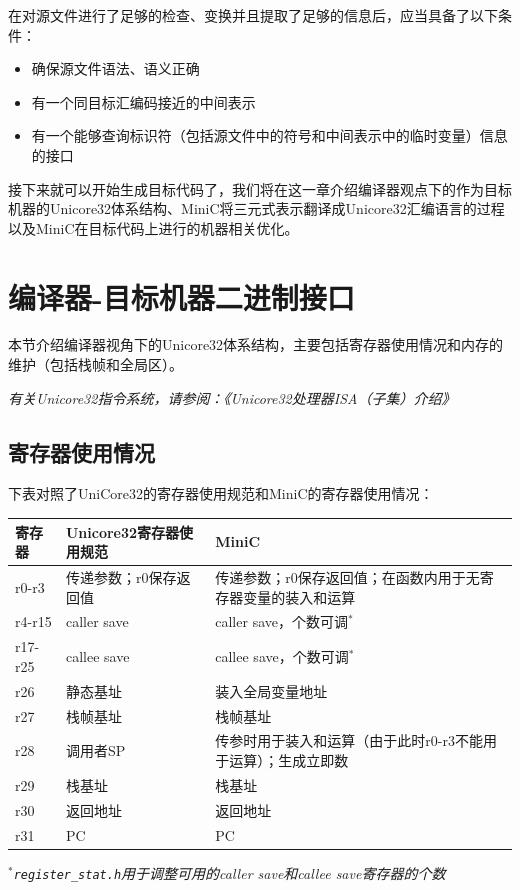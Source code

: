 在对源文件进行了足够的检查、变换并且提取了足够的信息后，应当具备了以下条件：
\begin{itemize}
	\item 确保源文件语法、语义正确
	\item 有一个同目标汇编码接近的中间表示
	\item 有一个能够查询标识符（包括源文件中的符号和中间表示中的临时变量）信息的接口
\end{itemize}
接下来就可以开始生成目标代码了，我们将在这一章介绍编译器观点下的作为目标机器的Unicore32体系结构、MiniC将三元式表示翻译成Unicore32汇编语言的过程以及MiniC在目标代码上进行的机器相关优化。
\section{编译器-目标机器二进制接口}
\label{target_machine}
本节介绍编译器视角下的Unicore32体系结构，主要包括寄存器使用情况和内存的维护（包括栈帧和全局区）。

{\it \anchor 有关Unicore32指令系统，请参阅：《Unicore32处理器ISA（子集）介绍》}\\

\subsection{寄存器使用情况}
下表对照了UniCore32的寄存器使用规范和MiniC的寄存器使用情况：
\begin{center}
	\begin{tabular}{|l|l|l|}
	\hline
		寄存器 & Unicore32寄存器使用规范 & MiniC \\
	\hline
		r0-r3 & 传递参数；r0保存返回值 & 传递参数；r0保存返回值；在函数内用于无寄存器变量的装入和运算 \\
	\hline
		r4-r15 & caller save & caller save，个数可调$^*$\\
	\hline
		r17-r25 & callee save & callee save，个数可调$^*$\\
	\hline
		r26 & 静态基址 & 装入全局变量地址\\
	\hline
		r27 & 栈帧基址 & 栈帧基址\\
	\hline  
		r28 & 调用者SP & 传参时用于装入和运算（由于此时r0-r3不能用于运算）；生成立即数\\
	\hline 
		r29 & 栈基址 & 栈基址 \\
	\hline
		r30 & 返回地址 & 返回地址 \\
	\hline 
		r31 & PC & PC \\
	\hline
	\end{tabular}
	\label{registerstat}
\end{center}
{\it $^*$\verb|register_stat.h|用于调整可用的caller save和callee save寄存器的个数}

